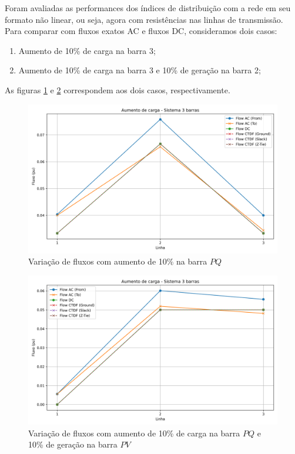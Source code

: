 \documentclass[journal]{IEEEtran}
\begin{document}
Foram avaliadas as performances dos índices de distribuição com a rede em seu formato não linear, ou seja, agora com resistências nas linhas de transmissão. Para comparar com fluxos exatos AC e fluxos DC, consideramos dois casos:
\begin{enumerate}
  \item Aumento de 10\% de carga na barra 3;
  \item Aumento de 10\% de carga na barra 3 e 10\% de geração na barra 2;
\end{enumerate} 

As figuras \ref{fig:fluxo_3bus_carga10} e \ref{fig:fluxo_3bus_cargaeger10} correspondem aos dois casos, respectivamente.

\begin{figure}[H]
\centering
\includegraphics[width=1.0\linewidth]{../images/3bus_carga10.png}
\caption{Variação de fluxos com aumento de 10\% na barra $PQ$}
\label{fig:fluxo_3bus_carga10}
\end{figure}

\begin{figure}[H]
\centering
\includegraphics[width=1.0\linewidth]{../images/3_bus_cargaegeracao10.png}
\caption{Variação de fluxos com aumento de 10\% de carga na barra $PQ$ e 10\% de geração na barra $PV$}
\label{fig:fluxo_3bus_cargaeger10}
\end{figure}
\end{document}
